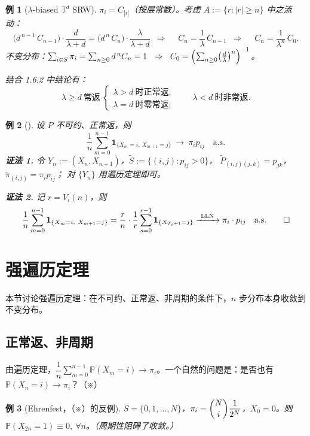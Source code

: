 \documentclass[lang=cn,10pt,newtx,thmcnt=chapter,mode=simple]{vividbook}
\providecommand{\Pp}{}\renewcommand{\Pp}{\mathbb{P}}
\newcommand{\ind}[1]{\mathbf{1}_{\{#1\}}}
\newcommand{\darr}{\;\Rightarrow\;}
\theoremstyle{vividthm}
\theoremstyle{vividdef}
\theoremstyle{vividexa}
\newtheorem*{vividexample}{例}
\theoremstyle{vividrem}
\newenvironment{example}[1][]{\begin{vividexample}[#1]}{\end{vividexample}}
\begin{document}
\begin{example}[$\lambda$-biased $\mathbb{T}^d$ SRW]
$\pi_i=C_{|i|}$（按层常数）。考虑 $A:=\{r:|r|\ge n\}$ 中之流动：
\[
\bigl(d^{\,n-1}\,C_{n-1}\bigr)\cdot\frac{d}{\lambda+d}
=\bigl(d^{\,n}\,C_n\bigr)\cdot\frac{\lambda}{\lambda+d}
\ \darr\quad
C_n=\frac1\lambda\,C_{n-1}
\ \darr\quad
C_n=\frac{1}{\lambda^n}\,C_0 .
\]
不变分布：$\sum_{i\in S}\pi_i=\sum_{n\ge0}d^{\,n}C_n=1\ \darr\
C_0=\Bigl(\sum_{n\ge0}\bigl(\tfrac d\lambda\bigr)^n\Bigr)^{-1}$。

结合 1.6.2 中结论有：
\[
\lambda\ge d\ \text{常返}\
\begin{cases}
\lambda>d\ \text{时正常返},\\
\lambda=d\ \text{时零常返};
\end{cases}
\qquad
\lambda<d\ \text{时非常返}.
\]
\end{example}

\begin{example}
设 $P$ 不可约、正常返，则
\[
\frac1n\sum_{m=0}^{n-1}\ind{X_m=i,\ X_{m+1}=j}\ \longrightarrow\ \pi_ip_{ij}
\quad\text{a.s.}
\]
\textbf{证法 1.} 令 $Y_n:=(X_n,X_{n+1})$，$\widetilde{S}:=\{(i,j):p_{ij}>0\}$，
$\widetilde{P}_{(i,j)(j,k)}=p_{jk}$，$\widetilde{\pi}_{(i,j)}=\pi_ip_{ij}$；
对 $\{Y_n\}$ 用遍历定理即可。

\textbf{证法 2.} 记 $r=V_i(n)$，则
\[
\frac1n\sum_{m=0}^{n-1}\ind{X_m=i,\ X_{m+1}=j}
=\frac{r}{n}\cdot\frac1r\sum_{s=0}^{r-1}\ind{X_{T_s+1}=j}
\xrightarrow{\ \text{LLN}\ }\pi_i\cdot p_{ij}
\quad\text{a.s.} \qed
\]
\end{example}

\section{强遍历定理}

本节讨论强遍历定理：在不可约、正常返、非周期的条件下，$n$ 步分布本身收敛到不变分布。

\subsection{正常返、非周期}

由遍历定理，$\dfrac1n\sum_{m=0}^{n-1}\Pp(X_m=i)\to\pi_i$。一个自然的问题是：是否也有
$\Pp(X_n=i)\to\pi_i$？（※）

\begin{example}[Ehrenfest，（※）的反例]
$S=\{0,1,\dots,N\}$，$\pi_i=\dbinom{N}{i}\dfrac{1}{2^N}$，$X_0=0$。则
$\Pp(X_{2n}=1)\equiv0,\ \forall n$。（周期性阻碍了收敛。）
\end{example}
\end{document}
